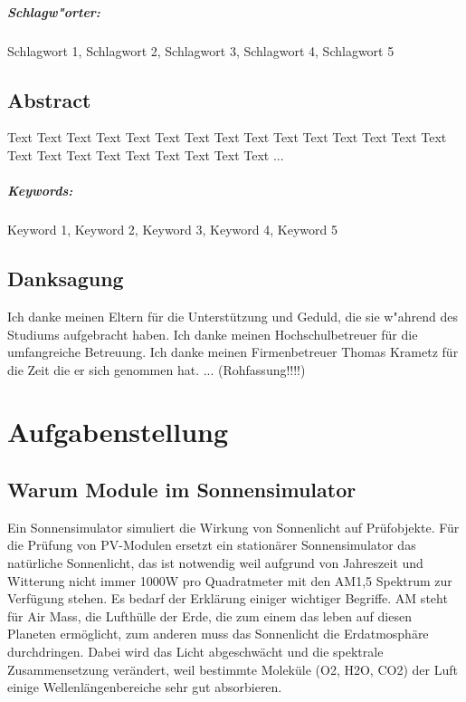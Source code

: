 \documentclass[a4paper,bibtotoc,oneside]{scrbook}
\begin{document}
\paragraph*{Schlagw"orter:} Schlagwort 1, Schlagwort 2, Schlagwort 3, Schlagwort 4, Schlagwort 5


\newpage

\section*{Abstract}\thispagestyle{empty}
Text Text Text Text Text Text Text Text Text Text Text Text Text Text Text Text Text Text Text Text Text Text Text Text ...
\\ \vfill
\paragraph*{Keywords:} Keyword 1, Keyword 2, Keyword 3, Keyword 4, Keyword 5
\newpage

\section*{Danksagung}\thispagestyle{empty}
Ich danke meinen Eltern für die Unterstützung und Geduld, die sie w"ahrend des Studiums aufgebracht haben.
Ich danke meinen Hochschulbetreuer für die umfangreiche Betreuung.
Ich danke meinen Firmenbetreuer Thomas Krametz für die Zeit die er sich genommen hat.
... (Rohfassung!!!!)
\newpage

\tableofcontents\thispagestyle{empty}
\newpage

\setcounter{page}{1}

\chapter{Aufgabenstellung}
\section{Warum Module im Sonnensimulator} \thispagestyle{empty}
Ein Sonnensimulator simuliert die Wirkung von Sonnenlicht auf Prüfobjekte. Für die Prüfung von PV-Modulen ersetzt ein stationärer Sonnensimulator das natürliche Sonnenlicht, das ist notwendig weil aufgrund von Jahreszeit und Witterung nicht immer 1000W pro Quadratmeter mit den AM1,5 Spektrum zur Verfügung stehen.
Es bedarf der Erklärung einiger wichtiger Begriffe. AM steht für Air Mass, die Lufthülle der Erde, die zum einem das leben auf diesen Planeten ermöglicht, zum anderen muss das Sonnenlicht die Erdatmosphäre durchdringen. Dabei wird das Licht abgeschwächt und die spektrale Zusammensetzung verändert, weil bestimmte Moleküle (O2, H2O, CO2) der Luft einige Wellenlängenbereiche sehr gut absorbieren. 
 
\end{document}
